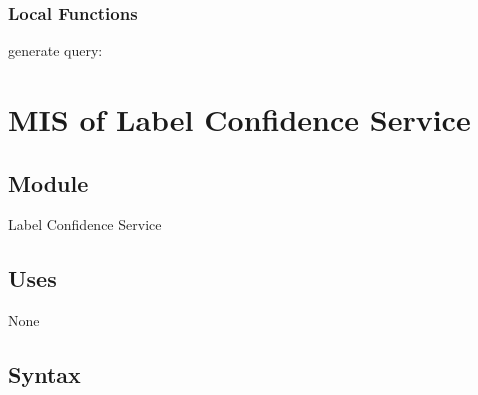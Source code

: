 \documentclass[12pt, titlepage]{article}
\begin{document}
  
  
  
  \subsubsection{Local Functions}

  generate query:
   
  

\newpage



\section{MIS of Label Confidence Service }\label{label confidence service}
  
  
  
  \subsection{Module}
  
  Label Confidence Service
  
  \subsection{Uses}
  
  None

  \subsection{Syntax}
\end{document}

